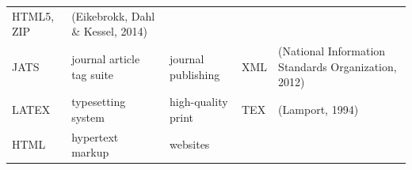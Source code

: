 \documentclass[10pt,fleqn]{wlpeerj}
\begin{document}
\begin{longtable}[c]{@{}lllll@{}}
\begin{minipage}[t]{0.09\columnwidth}
HTML5, ZIP
\strut\end{minipage} &
\begin{minipage}[t]{0.40\columnwidth}\raggedright\strut
(Eikebrokk, Dahl \& Kessel, 2014)
\strut\end{minipage}\tabularnewline
\begin{minipage}[t]{0.06\columnwidth}\raggedright\strut
JATS
\strut\end{minipage} &
\begin{minipage}[t]{0.18\columnwidth}\raggedright\strut
journal article tag suite
\strut\end{minipage} &
\begin{minipage}[t]{0.13\columnwidth}\raggedright\strut
journal publishing
\strut\end{minipage} &
\begin{minipage}[t]{0.09\columnwidth}\raggedright\strut
XML
\strut\end{minipage} &
\begin{minipage}[t]{0.40\columnwidth}\raggedright\strut
(National Information Standards Organization, 2012)
\strut\end{minipage}\tabularnewline
\begin{minipage}[t]{0.06\columnwidth}\raggedright\strut
LATEX
\strut\end{minipage} &
\begin{minipage}[t]{0.18\columnwidth}\raggedright\strut
typesetting system
\strut\end{minipage} &
\begin{minipage}[t]{0.13\columnwidth}\raggedright\strut
high-quality print
\strut\end{minipage} &
\begin{minipage}[t]{0.09\columnwidth}\raggedright\strut
TEX
\strut\end{minipage} &
\begin{minipage}[t]{0.40\columnwidth}\raggedright\strut
(Lamport, 1994)
\strut\end{minipage}\tabularnewline
\begin{minipage}[t]{0.06\columnwidth}\raggedright\strut
HTML
\strut\end{minipage} &
\begin{minipage}[t]{0.18\columnwidth}\raggedright\strut
hypertext markup
\strut\end{minipage} &
\begin{minipage}[t]{0.13\columnwidth}\raggedright\strut
websites
\strut\end{minipage} &
\begin{minipage}[t]{0.09\columnwidth}\raggedright\strut

\end{minipage}
\end{longtable}
\end{document}
